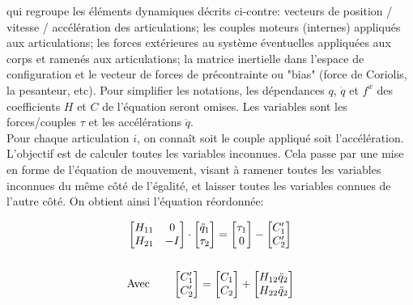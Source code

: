 \documentclass{report}
\begin{document}
qui regroupe les éléments dynamiques décrits ci-contre: vecteurs de position / vitesse / accélération des articulations; les couples moteurs (internes) appliqués aux articulations; les forces extérieures au système éventuelles appliquées aux corps et ramenés aux articulations; la matrice inertielle dans l'espace de configuration et le vecteur de forces de précontrainte ou "bias" (force de Coriolis, la pesanteur, etc).
Pour simplifier les notations, les dépendances $q$, $\dot{q}$ et $f^x$ des coefficients $H$ et $C$ de l'équation seront omises. Les variables sont les forces/couples $\tau$ et les accélérations $\ddot{q}$.\\
Pour chaque articulation $i$, on connaît soit le couple appliqué soit l'accélération. L'objectif est de calculer toutes les variables inconnues. Cela passe par une mise en forme de l'équation de mouvement, visant à ramener toutes les variables inconnues du même côté de l'égalité, et laisser toutes les variables connues de l'autre côté. On obtient ainsi l'équation réordonnée:

\begin{align}
&\begin{bmatrix}
  H_{11} & 0 \\
  H_{21} &  -I
\end{bmatrix} 
\cdot
\begin{bmatrix}
  \ddot{q}_1 \\
  \tau_2
\end{bmatrix} 
=
\begin{bmatrix}
  \tau_1 \\
  0
\end{bmatrix} 
-
\begin{bmatrix}
  C'_{1} \\
  C'_{2}
\end{bmatrix} \label{equ_equationMvt_dynHyb2} \\
\notag \\
&\textnormal{Avec} \qquad
\begin{bmatrix}
  C'_{1} \\
  C'_{2}
\end{bmatrix}
=
\begin{bmatrix}
  C_{1} \\
  C_{2}
\end{bmatrix}
+
\begin{bmatrix}
  H_{12} \ddot{q}_2 \\
  H_{22} \ddot{q}_2
\end{bmatrix} \label{equ_cPrime}
\end{align}
\end{document}
